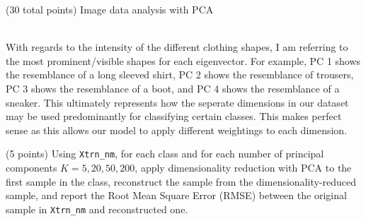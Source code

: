\documentclass[12pt]{article}
\begin{document}
\begin{question}{(30 total points) Image data analysis with PCA}
\begin{subquestion}
\begin{answerbox}{49em}
{\\
        With regards to the intensity of the different clothing shapes, I am referring to the most prominent/visible shapes for each eigenvector. For example, PC 1 shows the resemblance of a long sleeved shirt, PC 2 shows the resemblance of trousers, PC 3 shows the resemblance of a boot, and PC 4 shows the resemblance of a sneaker. This ultimately represents how the seperate dimensions in our dataset may be used predominantly for classifying certain classes. This makes perfect sense as this allows our model to apply different weightings to each dimension.
}
      \end{answerbox}
  


   \end{subquestion}

   \begin{subquestion}{(5 points)
       Using \texttt{Xtrn\_nm}, 
       for each class and for each number of principal components $K =
       5, 20, 50, 200$, apply dimensionality reduction with PCA to the
       first sample in the class, reconstruct the sample from the
       dimensionality-reduced sample, and 
       report the Root Mean Square Error (RMSE) between the
       original sample in {\tt Xtrn\_nm} and reconstructed one.
     } \label{Q1.6}

     


\end{subquestion}
\end{question}
\end{document}
